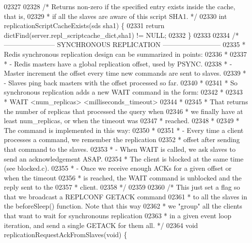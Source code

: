 \begin{DoxyCode}
{{{{{{{{{{{{{{{{{{{{{{{{{{{{{{{{{{{{{{{{{{{{{{{{{{{{{{{{{{{{{{{{{{{{{{{{{{{02327 
02328 \textcolor{comment}{/* Returns non-zero if the specified entry exists inside the cache, that is,}
02329 \textcolor{comment}{ * if all the slaves are aware of this script SHA1. */}
02330 \textcolor{keywordtype}{int} replicationScriptCacheExists(sds sha1) \{
02331     \textcolor{keywordflow}{return} dictFind(server.repl\_scriptcache\_dict,sha1) != NULL;
02332 \}
02333 
02334 \textcolor{comment}{/* ----------------------- SYNCHRONOUS REPLICATION --------------------------}
02335 \textcolor{comment}{ * Redis synchronous replication design can be summarized in points:}
02336 \textcolor{comment}{ *}
02337 \textcolor{comment}{ * - Redis masters have a global replication offset, used by PSYNC.}
02338 \textcolor{comment}{ * - Master increment the offset every time new commands are sent to slaves.}
02339 \textcolor{comment}{ * - Slaves ping back masters with the offset processed so far.}
02340 \textcolor{comment}{ *}
02341 \textcolor{comment}{ * So synchronous replication adds a new WAIT command in the form:}
02342 \textcolor{comment}{ *}
02343 \textcolor{comment}{ *   WAIT <num\_replicas> <milliseconds\_timeout>}
02344 \textcolor{comment}{ *}
02345 \textcolor{comment}{ * That returns the number of replicas that processed the query when}
02346 \textcolor{comment}{ * we finally have at least num\_replicas, or when the timeout was}
02347 \textcolor{comment}{ * reached.}
02348 \textcolor{comment}{ *}
02349 \textcolor{comment}{ * The command is implemented in this way:}
02350 \textcolor{comment}{ *}
02351 \textcolor{comment}{ * - Every time a client processes a command, we remember the replication}
02352 \textcolor{comment}{ *   offset after sending that command to the slaves.}
02353 \textcolor{comment}{ * - When WAIT is called, we ask slaves to send an acknowledgement ASAP.}
02354 \textcolor{comment}{ *   The client is blocked at the same time (see blocked.c).}
02355 \textcolor{comment}{ * - Once we receive enough ACKs for a given offset or when the timeout}
02356 \textcolor{comment}{ *   is reached, the WAIT command is unblocked and the reply sent to the}
02357 \textcolor{comment}{ *   client.}
02358 \textcolor{comment}{ */}
02359 
02360 \textcolor{comment}{/* This just set a flag so that we broadcast a REPLCONF GETACK command}
02361 \textcolor{comment}{ * to all the slaves in the beforeSleep() function. Note that this way}
02362 \textcolor{comment}{ * we "group" all the clients that want to wait for synchronouns replication}
02363 \textcolor{comment}{ * in a given event loop iteration, and send a single GETACK for them all. */}
02364 \textcolor{keywordtype}{void} replicationRequestAckFromSlaves(\textcolor{keywordtype}{void}) \{
}}}}}}}}}}}}}}}}}}}}}}}}}}}}}}}}}}}}}}}}}}}}}}}}}}}}}}}}}}}}}}}}}}}}}}}}}}}
\end{DoxyCode}
